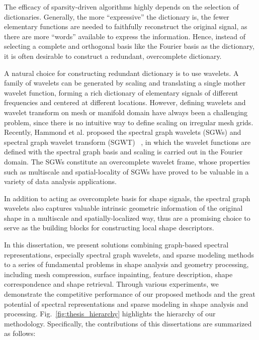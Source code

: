 The efficacy of sparsity-driven algorithms highly depends on the selection of dictionaries.
Generally, the more ``expressive'' the dictionary is, the fewer elementary functions
are needed to faithfully reconstruct the original signal, as there are more ``words''
available to express the information. Hence, instead of selecting a complete and orthogonal basis
like the Fourier basis as the dictionary, it is often desirable to construct a redundant, overcomplete
dictionary.

A natural choice for constructing redundant dictionary is to use wavelets. A family
of wavelets can be generated by scaling and translating a single mother wavelet function,
forming a rich dictionary of elementary signals of different frequencies and centered
at different locations. However, defining wavelets and wavelet transform on mesh or
manifold domain have always been a challenging problem, since there is no intuitive way
to define scaling on irregular mesh grids. Recently, Hammond et al. proposed the spectral
graph wavelets (SGWs) and spectral graph wavelet transform (SGWT)~\cite{Hammond2011}
, in which the wavelet functions are defined with the spectral graph basis and scaling is carried
out in the Fourier domain. The SGWs constitute an overcomplete wavelet frame, whose properties
such as multiscale and spatial-locality of SGWs have proved to be valuable in a variety of data
analysis applications.

In addition to acting as overcomplete basis for shape signals, the spectral
graph wavelets also captures valuable intrinsic geometric information of the original
shape in a multiscale and spatially-localized way, thus are a promising choice to
serve as the building blocks for constructing local shape descriptors.

In this dissertation, we present solutions combining graph-based spectral
representations, especially spectral graph wavelets, and sparse modeling
methods to a series of fundamental problems in shape analysis and geometry 
processing, including mesh compression, surface inpainting, feature description, 
shape correspondence and shape retrieval. Through various experiments, we 
demonstrate the competitive performance of our proposed methods and the great 
potential of spectral representations and sparse modeling in shape analysis and processing. 
Fig.~\ref{fig:thesis_hierarchy} highlights the hierarchy of our methodology. 
Specifically, the contributions of this dissertations are summarized as follows:

